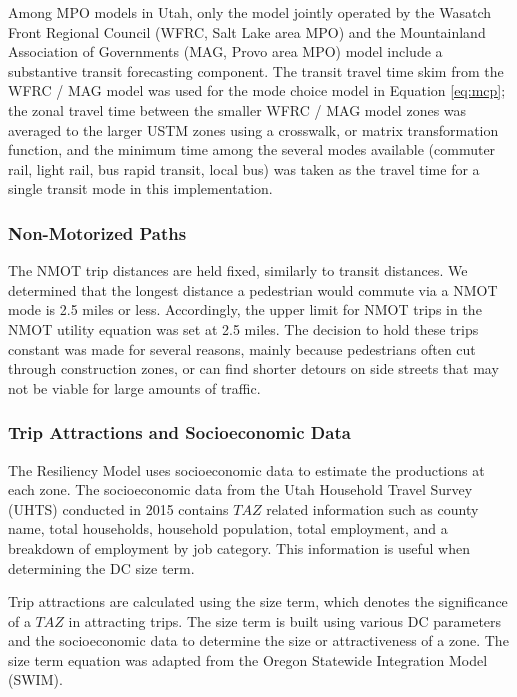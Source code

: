 Among MPO models in Utah, only the model jointly operated by the
Wasatch Front Regional Council (WFRC, Salt Lake area MPO) and the
Mountainland Association of Governments (MAG, Provo area MPO) model include a
substantive transit forecasting component. The transit travel time skim from the
WFRC / MAG model was used for the mode choice model in Equation \eqref{eq:mcp};
the zonal travel time between the smaller WFRC / MAG model zones was averaged
to the larger USTM zones using a crosswalk, or matrix transformation function, and the minimum time among the several modes available
(commuter rail, light rail, bus rapid transit, local bus) was taken as the travel
time for a single transit mode in this implementation.

\subsubsection{Non-Motorized Paths}

The NMOT trip distances are held fixed, similarly to transit distances. We determined that the longest distance a pedestrian would commute via a NMOT mode is 2.5 miles or less. Accordingly, the upper limit for NMOT trips in the NMOT utility equation was set at 2.5 miles. The decision to hold these trips constant was made for several reasons, mainly because pedestrians often cut through construction zones, or can find shorter detours on side streets that may not be viable for large amounts of traffic.

\subsubsection{Trip Attractions and Socioeconomic Data}

The Resiliency Model uses socioeconomic data to estimate the productions at
each zone. The socioeconomic data from the Utah Household Travel Survey (UHTS) conducted in 2015
contains $TAZ$ related information such as county name, total households, household population,
total employment, and a breakdown of employment by job category. This information is useful when
determining the DC size term.

Trip attractions are calculated using the size term, which denotes the significance of a $TAZ$ in
attracting trips. The size term is built using various DC parameters and the socioeconomic data
to determine the size or attractiveness of a zone. The size term equation was adapted from the
Oregon Statewide Integration Model (SWIM).


